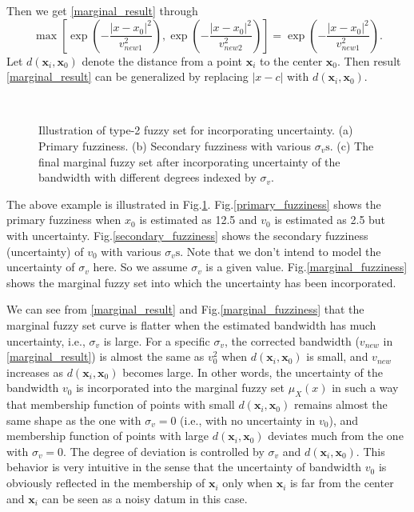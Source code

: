 \documentclass[journal,transmag]{IEEEtran}
\theoremstyle{definition}
\begin{document}
Then we get \eqref{marginal_result} through
\begin{equation*}
\max\left[\exp\left(-\frac{|x-x_0|^2}{v_{new1}^2}\right),\exp\left(-\frac{|x-x_0|^2}{v_{new2}^2}\right)\right]=\exp\left(-\frac{|x-x_0|^2}{v_{new1}^2}\right).
\end{equation*}
Let $d(\mathbf{x}_i,\mathbf{x}_0)$ denote the distance from a point $\mathbf{x}_i$ to the center $\mathbf{x}_0$. Then result \eqref{marginal_result} can be generalized by replacing $|x-c|$ with $d(\mathbf{x}_i,\mathbf{x}_0)$.
\begin{figure}[!t]
   \centering
   \\
  \caption{Illustration  of type-2 fuzzy set for incorporating uncertainty. (a) Primary fuzziness. (b) Secondary fuzziness with various $\sigma_v\text{s}$. (c) The final marginal fuzzy set after incorporating  uncertainty of the bandwidth with different degrees indexed by $\sigma_v$.}
\label{type2_fs_uncertainty}
\end{figure}

The above example is illustrated in Fig.\ref{type2_fs_uncertainty}. Fig.\ref{primary_fuzziness} shows the primary fuzziness when $x_0$ is estimated as 12.5 and $v_0$ is estimated as 2.5 but with uncertainty. Fig.\ref{secondary_fuzziness} shows the secondary fuzziness (uncertainty) of $v_0$ with various $\sigma_v\text{s}$. Note that we don't intend to model the uncertainty of $\sigma_v$ here. So we assume $\sigma_v$ is a given value. Fig.\ref{marginal_fuzziness} shows the marginal fuzzy set into which the uncertainty has been incorporated.

We can see from \eqref{marginal_result} and Fig.\ref{marginal_fuzziness} that the marginal fuzzy set curve is flatter when the estimated bandwidth has much uncertainty, i.e., $\sigma_v$ is large.
For a specific $\sigma_v$, the corrected bandwidth ($v_{new}$ in \eqref{marginal_result}) is almost the same as $v_0^2$ when $d(\mathbf{x}_i,\mathbf{x}_0)$ is small, and $v_{new}$ increases as $d(\mathbf{x}_i,\mathbf{x}_0)$ becomes large.
In other words, the uncertainty of the bandwidth $v_0$ is incorporated into the marginal fuzzy set $\mu_X(x)$ in such a way that membership function of points with small $d(\mathbf{x}_i,\mathbf{x}_0)$ remains almost the same shape as the one with $\sigma_v=0$ (i.e., with no uncertainty in $v_0$), and membership function of points with large $d(\mathbf{x}_i,\mathbf{x}_0)$ deviates much from the one with $\sigma_v=0$. The degree of deviation is controlled by $\sigma_v$ and $d(\mathbf{x}_i,\mathbf{x}_0)$. This behavior is very intuitive in the sense that the uncertainty of bandwidth $v_0$ is obviously reflected in the membership of $\mathbf{x}_i$ only when $\mathbf{x}_i$ is far from the center and $\mathbf{x}_i$ can be seen as a noisy datum in this case.
\end{document}
